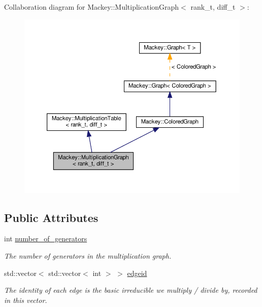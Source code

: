 Collaboration diagram for Mackey\+:\+:Multiplication\+Graph$<$ rank\+\_\+t, diff\+\_\+t $>$\+:\nopagebreak
\begin{figure}[H]
\begin{center}
\leavevmode
\includegraphics[width=350pt]{classMackey_1_1MultiplicationGraph__coll__graph}
\end{center}
\end{figure}
\subsection*{Public Attributes}
\begin{DoxyCompactItemize}
\item 
int \hyperlink{classMackey_1_1MultiplicationGraph_a9fd088a706e8c2ffeae3db1584de9266}{number\+\_\+of\+\_\+generators}
\begin{DoxyCompactList}\small\item\em The number of generators in the multiplication graph. \end{DoxyCompactList}\item 
std\+::vector$<$ std\+::vector$<$ int $>$ $>$ \hyperlink{classMackey_1_1MultiplicationGraph_aa0eb04947f664262233ed4cdf650371b}{edgeid}
\begin{DoxyCompactList}\small\item\em The identity of each edge is the basic irreducible we multiply / divide by, recorded in this vector. \end{DoxyCompactList}\end{DoxyCompactItemize}
